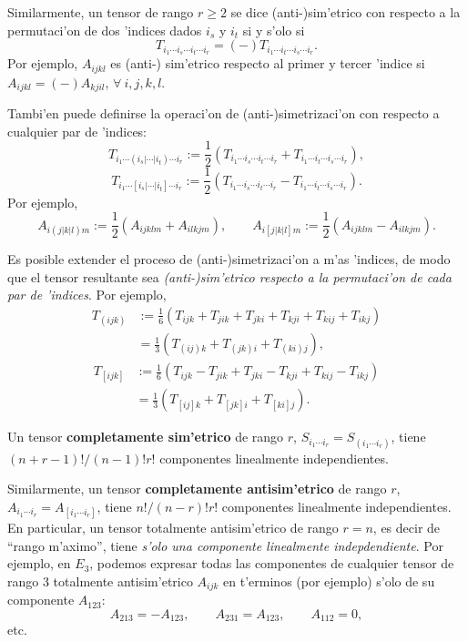 Similarmente, un tensor de rango $r\ge 2$ se dice (anti-)sim'etrico con respecto a la permutaci'on de dos 'indices dados $i_s$ y $i_t$ si y s'olo si
\begin{equation}
T_{i_1\cdots i_s\cdots i_t\cdots i_r}=(-)T_{i_1\cdots i_t\cdots i_s\cdots i_r}.
\end{equation}
Por ejemplo, $A_{ijkl}$ es (anti-) sim'etrico respecto al primer y tercer 'indice si $A_{ijkl}=(-)A_{kjil}$, $\forall\ i,j,k,l$.

Tambi'en puede definirse la operaci'on de (anti-)simetrizaci'on con respecto a cualquier par de 'indices:
\begin{equation}
T_{i_1\cdots (i_s|\cdots |i_t)\cdots i_r}:=\frac{1}{2}\left(T_{i_1\cdots i_s\cdots i_t\cdots i_r}+T_{i_1\cdots i_t\cdots i_s\cdots i_r}\right),
\end{equation}
\begin{equation}
T_{i_1\cdots [i_s|\cdots |i_t]\cdots i_r}:=\frac{1}{2}\left(T_{i_1\cdots i_s\cdots i_t\cdots i_r}-T_{i_1\cdots i_t\cdots i_s\cdots i_r}\right).
\end{equation}
Por ejemplo, 
\begin{equation}
A_{i(j|k|l)m}:=\frac{1}{2}\left(A_{ijklm}+A_{ilkjm}\right), \qquad A_{i[j|k|l]m}:=\frac{1}{2}\left(A_{ijklm}-A_{ilkjm}\right).
\end{equation}

Es posible extender el proceso de (anti-)simetrizaci'on a m'as 'indices, de modo que el tensor resultante sea \textit{(anti-)sim'etrico respecto a la permutaci'on de cada par de 'indices}. Por ejemplo,
\begin{align}
T_{(ijk)} &:= \frac{1}{6}\left(T_{ijk}+T_{jik}+T_{jki}+T_{kji}+T_{kij}+T_{ikj}\right) \\
&= \frac{1}{3}\left(T_{(ij)k}+T_{(jk)i}+T_{(ki)j}\right),
\end{align}
\begin{align}
T_{[ijk]} &:= \frac{1}{6}\left(T_{ijk}-T_{jik}+T_{jki}-T_{kji}+T_{kij}-T_{ikj}\right) \\
&= \frac{1}{3}\left(T_{[ij]k}+T_{[jk]i}+T_{[ki]j}\right).
\end{align}

Un tensor \textbf{completamente sim'etrico} de rango $r$, $S_{i_1\cdots i_r}=S_{(i_1\cdots i_r)}$, tiene $(n+r-1)!/(n-1)!r!$ componentes linealmente independientes.

Similarmente, un tensor \textbf{completamente antisim'etrico} de rango $r$, $A_{i_1\cdots i_r}=A_{[i_1\cdots i_r]}$, tiene $n!/(n-r)!r!$ componentes linealmente independientes. En particular, un tensor totalmente antisim'etrico de rango $r=n$, es decir de ``rango m'aximo'', tiene \textit{s'olo una componente linealmente indepdendiente}. Por ejemplo, en $E_3$, podemos expresar todas las componentes de cualquier tensor de rango 3 totalmente antisim'etrico $A_{ijk}$ en t'erminos (por ejemplo) s'olo de su componente $A_{123}$:
\begin{equation}
A_{213}=-A_{123}, \qquad A_{231}=A_{123}, \qquad A_{112}=0, 
\end{equation}
etc.

